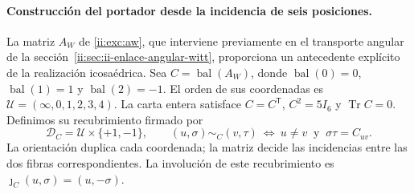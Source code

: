 \paragraph{Construcción del portador desde la incidencia de seis posiciones.}
\label{ii:ii:ico:construccion-firmada}
La matriz \(A_W\) de \eqref{ii:exc:aw}, que interviene previamente en el
transporte angular de la sección~\ref{ii:sec:ii-enlace-angular-witt}, proporciona
un antecedente explícito de la realización icosaédrica. Sea
\(C=\operatorname{bal}(A_W)\), donde
\(\operatorname{bal}(0)=0\), \(\operatorname{bal}(1)=1\) y
\(\operatorname{bal}(2)=-1\). El orden de sus coordenadas es
\(\mathcal U=(\infty,0,1,2,3,4)\). La carta entera satisface
\(C=C^{\mathsf T}\), \(C^2=5I_6\) y \(\operatorname{Tr}C=0\).
Definimos su recubrimiento firmado por
\begin{equation}
 \mathcal D_C=\mathcal U\times\{+1,-1\},\qquad
 (u,\sigma)\sim_C(v,\tau)
 \ \Longleftrightarrow\ u\ne v\ \text{ y }\ \sigma\tau=C_{uv}.
 \label{ii:ii:ico:incidencia-firmada}
\end{equation}
La orientación duplica cada coordenada; la matriz decide las incidencias
entre las dos fibras correspondientes. La involución de este recubrimiento
es \(\jmath_C(u,\sigma)=(u,-\sigma)\).

